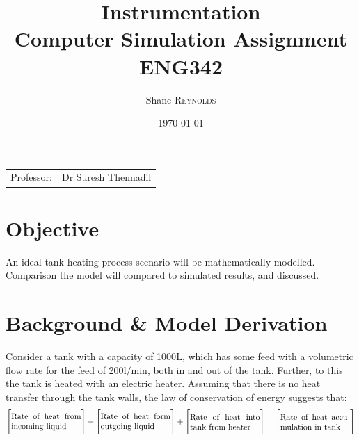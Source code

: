 \documentclass{article}
\title{Instrumentation \\ Computer Simulation Assignment \\ ENG342} %
\author{Shane \textsc{Reynolds}} %
\date{\today} %
\begin{document}
\maketitle %

\begin{center}
\begin{tabular}{l r}
Professor: & Dr Suresh Thennadil %
\end{tabular}
\end{center}


\tableofcontents
\newpage


\section{Objective}

An ideal tank heating process scenario will be mathematically modelled. Comparison the model will compared to simulated results, and discussed.


\section{Background \& Model Derivation}
Consider a tank with a capacity of 1000$\si{\liter}$, which has some feed with a volumetric flow rate for the feed of 200$\si{\litre\per\minute}$, both in and out of the tank. Further, to this the tank is heated with an electric heater. Assuming that there is no heat transfer through the tank walls, the law of conservation of energy suggests that:
\begin{align}
\Bigg[\parbox{3cm}{Rate of heat from incoming liquid}\Bigg] - \Bigg[\parbox{3cm}{Rate of heat form outgoing liquid}\Bigg] + \Bigg[\parbox{3cm}{Rate of heat into tank from heater}\Bigg] = \Bigg[\parbox{3cm}{Rate of heat accumulation in tank}\Bigg]
\end{align}
\end{document}
